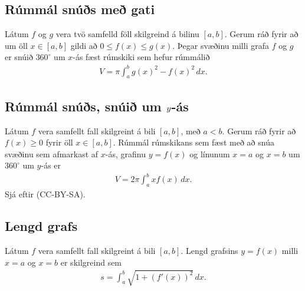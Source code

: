\documentclass[a4paper,10pt,icelandic]{sphinxmanual}
\begin{document}
\ignorespaces 

\subsection{Rúmmál snúðs með gati}
\label{\detokenize{kafli07:rummal-snus-me-gati}}\label{\detokenize{kafli07:index-4}}
Látum \(f\) og \(g\) vera tvö samfelld föll skilgreind á bilinu
\([a, b]\). Gerum ráð fyrir að um öll \(x\in [a, b]\) gildi að
\(0\leq f(x)\leq
g(x)\). Þegar svæðinu milli grafa \(f\) og \(g\) er snúið
\(360^\circ\) um \(x\)-ás fæst rúmskiki sem hefur rúmmálið
\begin{equation*}
\begin{split}V=\pi\int_a^b g(x)^2-f(x)^2\,dx.\end{split}
\end{equation*}
\ignorespaces 

\subsection{Rúmmál snúðs, snúið um \protect\(y\protect\)-ás}
\label{\detokenize{kafli07:index-5}}\label{\detokenize{kafli07:id1}}
Látum \(f\) vera samfellt fall skilgreint á bili \([a, b]\), með
\(a<b\). Gerum ráð fyrir að \(f(x)\geq 0\) fyrir öll
\(x\in [a, b]\). Rúmmál rúmskikans sem fæst með að snúa svæðinu sem
afmarkast af \(x\)-ás, grafinu \(y=f(x)\) og línunum \(x=a\)
og \(x=b\) um \(360^\circ\) um \(y\)-ás er
\begin{equation*}
\begin{split}V=2\pi\int_a^b xf(x)\,dx.\end{split}
\end{equation*}
\ignorespaces 
Sjá 
eftir  (CC-BY-SA).


\subsection{Lengd grafs}
\label{\detokenize{kafli07:lengd-grafs}}
Látum \(f\) vera samfellt fall skilgreint á bili \([a, b]\).
Lengd grafsins \(y=f(x)\) milli \(x=a\) og \(x=b\) er
skilgreind sem
\begin{equation*}
\begin{split}s=\int_a^b\sqrt{1+(f'(x))^2}\,dx.\end{split}
\end{equation*}
\ignorespaces 
\end{document}
